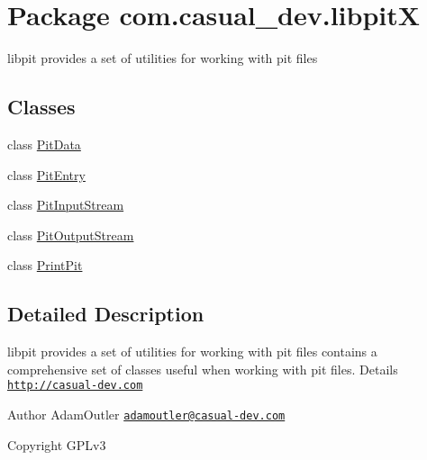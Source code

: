 \hypertarget{namespacecom_1_1casual__dev_1_1libpit_x}{\section{Package com.\-casual\-\_\-dev.\-libpit\-X}
\label{namespacecom_1_1casual__dev_1_1libpit_x}
}


libpit provides a set of utilities for working with pit files  


\subsection*{Classes}
\begin{DoxyCompactItemize}
\item 
class \hyperlink{classcom_1_1casual__dev_1_1libpit_x_1_1_pit_data}{Pit\-Data}
\item 
class \hyperlink{classcom_1_1casual__dev_1_1libpit_x_1_1_pit_entry}{Pit\-Entry}
\item 
class \hyperlink{classcom_1_1casual__dev_1_1libpit_x_1_1_pit_input_stream}{Pit\-Input\-Stream}
\item 
class \hyperlink{classcom_1_1casual__dev_1_1libpit_x_1_1_pit_output_stream}{Pit\-Output\-Stream}
\item 
class \hyperlink{classcom_1_1casual__dev_1_1libpit_x_1_1_print_pit}{Print\-Pit}
\end{DoxyCompactItemize}


\subsection{Detailed Description}
libpit provides a set of utilities for working with pit files contains a comprehensive set of classes useful when working with pit files. Details \href{http://casual-dev.com}{\tt http\-://casual-\/dev.\-com} \begin{DoxyAuthor}{Author}
Adam\-Outler \href{mailto:adamoutler@casual-dev.com}{\tt adamoutler@casual-\/dev.\-com} 
\end{DoxyAuthor}
\begin{DoxyCopyright}{Copyright}
G\-P\-Lv3 
\end{DoxyCopyright}
